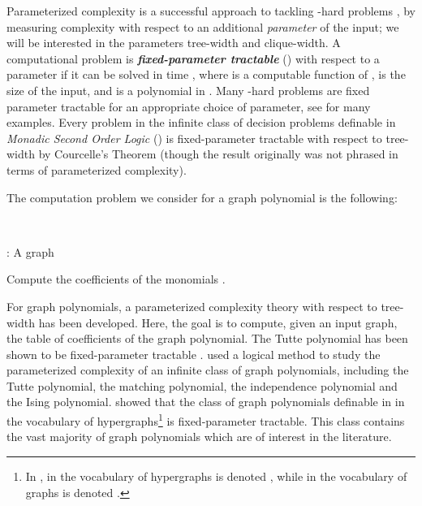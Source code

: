 \documentclass{llncs}
\begin{document}
Parameterized complexity is a successful approach to tackling -hard
problems \cite{bk:DF99,bk:FG06}, by measuring complexity with respect
to an additional {\em parameter} of the input; we will be interested in the parameters
tree-width and clique-width. A computational problem is {\em\bf fixed-parameter tractable}
() with respect to a parameter  if it can be solved in
time , where  is a computable function of ,
 is the size of the input, and  is a polynomial in .
Many -hard problems are fixed parameter tractable for an appropriate
choice of parameter, see \cite{bk:FG06} for many examples. Every
problem in the infinite class of decision problems definable in {\em Monadic Second Order Logic}
() is fixed-parameter tractable with respect to tree-width
by Courcelle's Theorem \cite{ar:Courcelle90,ar:ArnborgEtAl,bk:CourcelleEngelfriet12}
(though the result originally was not phrased in terms of parameterized
complexity). 

The computation problem we consider for a graph polynomial 
is the following:

~~~~~~~~~~\begin{minipage}[t]{1\columnwidth}

: A graph 

 Compute the coefficients 
of the monomials . \end{minipage}

For graph polynomials, a parameterized complexity theory with respect
to tree-width has been developed. Here, the goal is to compute, given
an input graph, the table of coefficients of the graph polynomial.
The Tutte polynomial has been shown to be fixed-parameter tractable
\cite{ar:noble98,ar:andrzejak98}. \cite{makowsky2005coloured} used
a logical method to study the parameterized complexity of an infinite
class of graph polynomials, including the Tutte polynomial, the matching
polynomial, the independence polynomial and the Ising polynomial.
\cite{makowsky2005coloured} showed that the class of graph polynomials
definable in  in the vocabulary of hypergraphs\footnote{In \cite{bk:CourcelleEngelfriet12},  in the vocabulary of hypergraphs is denoted , while  in the vocabulary of graphs is denoted .}
is fixed-parameter tractable. This class contains the vast majority
of graph polynomials which are of interest in the literature. 
\end{document}
